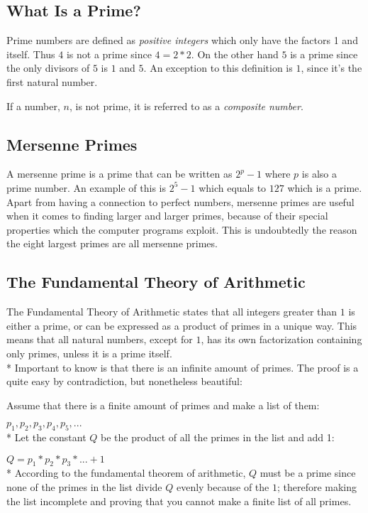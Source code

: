 \documentclass[main.tex]{subfiles}
\begin{document}
\subsection{What Is a Prime?}
Prime numbers are defined as \textit{positive integers} which only have the
factors 1 and itself. Thus $4$ is not a prime since $4 = 2 * 2$. On the other
hand $5$ is a prime since the only divisors of $5$ is $1$ and $5$. An exception
to this definition is $1$, since it's the first natural number.

If a number, $n$, is not prime, it is referred to as a \textit{composite
  number}.

\subsection{Mersenne Primes}
A mersenne prime is a prime that can be written as $2^{p}-1$ where $p$ is also a
prime number. An example of this is $2^5-1$ which equals to $127$ which is a
prime. Apart from having a connection to perfect numbers, mersenne primes are
useful when it comes to finding larger and larger primes, because of their
special properties which the computer programs exploit. This is undoubtedly the
reason the eight largest primes are all mersenne primes.

\subsection{The Fundamental Theory of Arithmetic}
The Fundamental Theory of Arithmetic \cite{theorem:arithmetic} states that all
integers greater than $1$ is either a prime, or can be expressed as a product of
primes in a unique way. This means that all natural numbers, except for $1$, has
its own factorization containing only primes, unless it is a prime itself.
\newline
\\*
Important to know is that there is an infinite amount of primes. The proof is a
quite easy by contradiction, but nonetheless beautiful:

\begin{mdframed}
  Assume that there is a finite amount of primes and make a list of them:

  $p_1, p_2, p_3, p_4, p_5, ...$ \newline
  \\*
  Let the constant $Q$ be the product of all the primes in the list and add 1:

  $Q = p_1 * p_2 * p_3 * ... + 1$ \newline
  \\*
  According to the fundamental theorem of arithmetic, $Q$ must be a prime since
  none of the primes in the list divide $Q$ evenly because of the $1$; therefore
  making the list incomplete and proving that you cannot make a finite list of
  all primes.
\end{mdframed}
\end{document}
